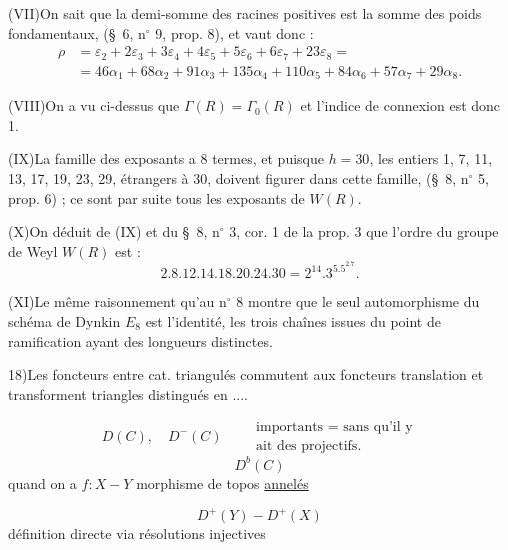 (VII)\quad On sait que la demi-somme des racines positives est la somme des
poids fondamentaux, (\S\ 6, n$^\circ$ 9, prop. 8), et vaut donc :
\[
\begin{aligned}
\rho&=\varepsilon_2+2\varepsilon_3+3\varepsilon_4+4\varepsilon_5+
5\varepsilon_6+6\varepsilon_7+23\varepsilon_8=\\
&=46\alpha_1+68\alpha_2+91\alpha_3+135\alpha_4+110\alpha_5+84\alpha_6+57\alpha_7+29\alpha_8.
\end{aligned}
\]

(VIII)\quad On a vu ci-dessus que $\Gamma(R)=\Gamma_0(R)$ et l'indice de connexion
est donc 1.

(IX)\quad La famille des exposants a 8 termes, et puisque $h=30$, les entiers
1, 7, 11, 13, 17, 19, 23, 29, étrangers à 30, doivent figurer dans cette
famille, (\S\ 8, n$^\circ$ 5, prop. 6) ; ce sont par suite tous les exposants de $W(R)$.

(X)\quad On déduit de (IX) et du \S\ 8, n$^\circ$ 3, cor. 1 de la prop. 3 que
l'ordre du groupe de Weyl $W(R)$ est :
\[
2.8.12.14.18.20.24.30=2^{14}.3^5.5^2.7.
\]

(XI)\quad Le même raisonnement qu'au n$^\circ$ 8 montre que le seul automorphisme
du schéma de Dynkin $E_8$ est l'identité, les trois chaînes issues du point de
ramification ayant des longueurs distinctes.

18)\quad Les foncteurs entre cat. triangulés 
commutent aux foncteurs translation et transforment triangles distingués
en  ....

\[
D(C),\quad D^-(C)\qquad
\begin{gathered}\text{importants = sans qu'il y}\\\text{ait des projectifs.}\end{gathered}
\]
\[
D^b(C)
\]
quand on a $f:X\mathbin{-}Y$ morphisme 
de topos \uline{annelés}

\[
D^+(Y)\mathbin{-}D^+(X)
\]
définition directe via résolutions injectives

